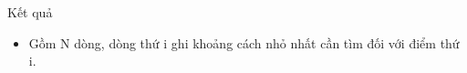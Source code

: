 Kết quả
\begin{itemize}
	\item Gồm N dòng, dòng thứ i ghi khoảng cách nhỏ nhất cần tìm đối với điểm thứ i.
\end{itemize}